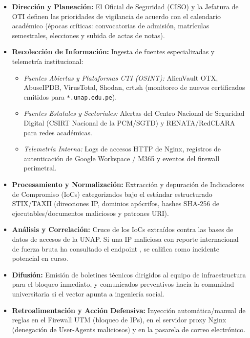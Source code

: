 \begin{itemize}[itemsep=2.5pt,topsep=2pt,parsep=0pt]
    \item \textbf{Dirección y Planeación:} El Oficial de Seguridad (CISO) y la Jefatura de OTI definen las prioridades de vigilancia de acuerdo con el calendario académico (épocas críticas: convocatorias de admisión, matrículas semestrales, elecciones y subida de actas de notas).
    \item \textbf{Recolección de Información:} Ingesta de fuentes especializadas y telemetría institucional:
    \begin{itemize}[itemsep=1.5pt,topsep=1pt,parsep=0pt]
        \item \textit{Fuentes Abiertas y Plataformas CTI (OSINT):} AlienVault OTX, AbuseIPDB, VirusTotal, Shodan, crt.sh (monitoreo de nuevos certificados emitidos para \texttt{*.unap.edu.pe}).
        \item \textit{Fuentes Estatales y Sectoriales:} Alertas del Centro Nacional de Seguridad Digital (CSIRT Nacional de la PCM/SGTD) y RENATA/RedCLARA para redes académicas.
        \item \textit{Telemetría Interna:} Logs de accesos HTTP de Nginx, registros de autenticación de Google Workspace / M365 y eventos del firewall perimetral.
    \end{itemize}
    \item \textbf{Procesamiento y Normalización:} Extracción y depuración de Indicadores de Compromiso (IoCs) categorizados bajo el estándar estructurado STIX/TAXII (direcciones IP, dominios apócrifos, hashes SHA-256 de ejecutables/documentos maliciosos y patrones URI).
    \item \textbf{Análisis y Correlación:} Cruce de los IoCs extraídos contra las bases de datos de accesos de la UNAP. Si una IP maliciosa con reporte internacional de fuerza bruta ha consultado el endpoint , se califica como incidente potencial en curso.
    \item \textbf{Difusión:} Emisión de boletines técnicos dirigidos al equipo de infraestructura para el bloqueo inmediato, y comunicados preventivos hacia la comunidad universitaria si el vector apunta a ingeniería social.
    \item \textbf{Retroalimentación y Acción Defensiva:} Inyección automática/manual de reglas en el Firewall UTM (bloqueo de IPs), en el servidor proxy Nginx (denegación de User-Agents maliciosos) y en la pasarela de correo electrónico.
\end{itemize}

